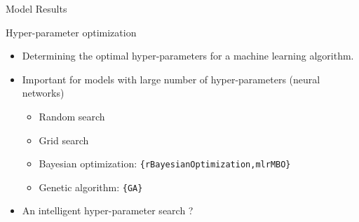 \documentclass[12pt,ignorenonframetext,]{beamer}
\newenvironment{Shaded}{\begin{snugshade}}{\end{snugshade}}
\newcommand{\CommentTok}[1]{\textcolor[rgb]{0.56,0.35,0.01}{\textit{#1}}}
\newcommand{\DecValTok}[1]{\textcolor[rgb]{0.00,0.00,0.81}{#1}}
\newcommand{\KeywordTok}[1]{\textcolor[rgb]{0.13,0.29,0.53}{\textbf{#1}}}
\newcommand{\NormalTok}[1]{#1}
\newcommand{\OperatorTok}[1]{\textcolor[rgb]{0.81,0.36,0.00}{\textbf{#1}}}
\newcommand{\StringTok}[1]{\textcolor[rgb]{0.31,0.60,0.02}{#1}}
\providecommand{\tightlist}{%
  \setlength{\itemsep}{0pt}\setlength{\parskip}{0pt}}
\begin{document}
\begin{frame}[fragile]{Model Results}
\protect\hypertarget{model-results}{}

\tiny

\begin{Shaded}
\end{Shaded}

\normalsize

\end{frame}

\begin{frame}{Hyper-parameter optimization}
\protect\hypertarget{hyper-parameter-optimization}{}

\begin{itemize}
\tightlist
\item
  Determining the optimal hyper-parameters for a machine learning
  algorithm. \vspace{2mm}
\item
  Important for models with large number of hyper-parameters (neural
  networks)

  \begin{itemize}
      \item Random search
      \item Grid search
      \item Bayesian optimization: \texttt{\{rBayesianOptimization,mlrMBO\}}
      \item Genetic algorithm: \texttt{\{GA\}}
    \end{itemize}
   \vspace{2mm}
\item
  An intelligent hyper-parameter search ?
\end{itemize}

\end{frame}
\end{document}
